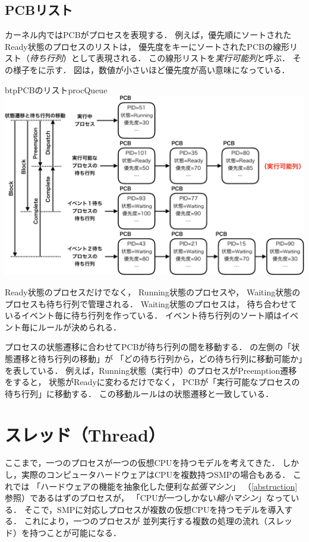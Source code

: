 \subsection{PCBリスト}
カーネル内ではPCBがプロセスを表現する．
例えば，優先順にソートされたReady状態のプロセスのリストは，
優先度をキーにソートされたPCBの線形リスト（\emph{待ち行列}）として表現される．
この線形リストを\emph{実行可能列}と呼ぶ．
その様子をに示す．
図は，数値が小さいほど優先度が高い意味になっている．

\begin{myfig}{btp}{PCBのリスト}{procQueue}
  \includegraphics[scale=0.55]{Fig/procQueue-crop.pdf}
\end{myfig}

Ready状態のプロセスだけでなく，
Running状態のプロセスや，
Waiting状態のプロセスも待ち行列で管理される．
Waiting状態のプロセスは，
待ち合わせているイベント毎に待ち行列を作っている．
イベント待ち行列のソート順はイベント毎にルールが決められる．

プロセスの状態遷移に合わせてPCBが待ち行列の間を移動する．
の左側の「状態遷移と待ち行列の移動」が
「どの待ち行列から，どの待ち行列に移動可能か」を表している．
例えば，Running状態（実行中）のプロセスがPreemption遷移をすると，
状態がReadyに変わるだけでなく，
PCBが「実行可能なプロセスの待ち行列」に移動する．
この移動ルールはの状態遷移と一致している．

\section{スレッド（Thread）}
ここまで，一つのプロセスが一つの仮想CPUを持つモデルを考えてきた．
しかし，実際のコンピュータハードウェアはCPUを複数持つSMPの場合もある．
これでは
「ハードウェアの機能を抽象化した便利な\emph{拡張マシン}」
（\ref{abstruction}参照）であるはずのプロセスが，
「CPUが一つしかない\emph{縮小マシン}」なっている．
そこで，SMPに対応しプロセスが複数の仮想CPUを持つモデルを導入する．
これにより，一つのプロセスが
並列実行する複数の処理の流れ（スレッド）を持つことが可能になる．

